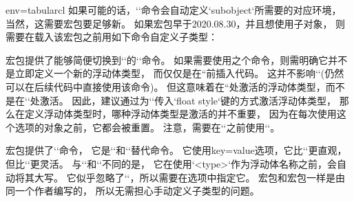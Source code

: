 \begin{tableobject}{env=tabular}{cl}
如果可能的话，`\NewObjectStyle`命令会自动定义`subobject`所需要的对应环境，
当然，这需要宏包要足够新。
如果宏包早于2020.08.30，并且想使用子对象，
则需要在载入该宏包之前用如下命令自定义子类型：
\begin{examplecode}
\end{examplecode}

\DescribeMacro{\trivfloat}
宏包提供了能够简便切换到`\newfloat`的``命令。
如果需要使用之个命令，则需明确它并不是立即定义一个新的浮动体类型，
而仅仅是在``前插入代码。
这并不影响`\NewObjectStyle`(仍然可以在后续代码中直接使用该命令)。
但这意味着在``处激活的浮动体类型，而不是在`\trivfloat`处激活。
因此，建议通过为`\NewObjectStyle`传入`float style`键的方式激活浮动体类型，
那么在定义浮动体类型时，哪种浮动体类型是激活的并不重要，
因为在每次使用这个选项的对象之前，它都会被重置。
注意，需要在``之前使用`\trivfloat`。

\DescribeMacro{\DeclareFloatingEnvironment}
宏包提供了``命令，
它是`\newfloat`和`\trivfloat`替代命令。
它使用key=value选项，它比`\newfloat`更直观，但比`\trivfloat`更灵活。
与`\newfloat`和`\trivfloat`不同的是，
它在使用`<type>`作为浮动体名称之前，会自动将其大写。
它似乎忽略了`\floatstyle`，所以需要在选项中指定它。
宏包和宏包一样是由同一个作者编写的，
所以无需担心手动定义子类型的问题。



\end{tableobject}
